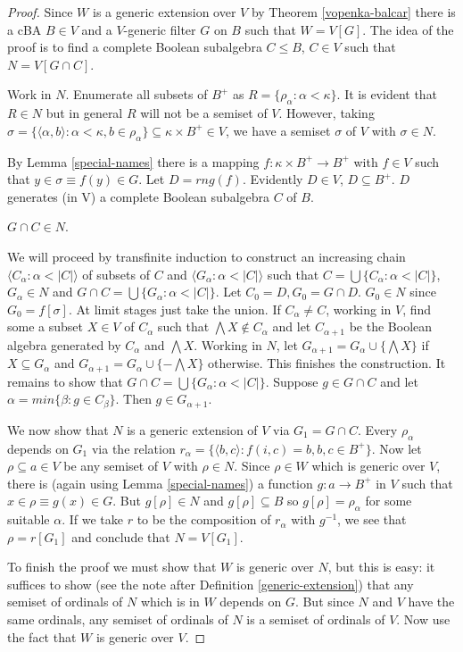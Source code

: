 \begin{proof}
Since $W$ is a generic extension over $V$ by Theorem \ref{vopenka-balcar} there is a cBA $B\in V$ and a $V$-generic filter $G$ on $B$ such that
$W=V[G]$. The idea of the proof is to find a complete Boolean subalgebra $C\leq B$, $C\in V$ such that $N=V[G\cap C]$.

Work in $N$. Enumerate all subsets of $B^+$ as $R=\{\rho_\alpha:\alpha<\kappa\}$. It is evident that $R\in N$ but in general $R$ will not be a semiset of $V$.
However, taking $\sigma=\{\langle\alpha,b\rangle:\alpha<\kappa,b\in\rho_\alpha\}\subseteq\kappa\times B^+\in V$, we have a semiset $\sigma$ of $V$ with $\sigma\in N$.

By Lemma \ref{special-names} there is a mapping $f:\kappa\times B^+\to B^+$ with $f\in V$ such that $y\in\sigma\equiv f(y)\in G$. Let $D=rng(f)$. Evidently
$D\in V$, $D\subseteq B^+$. $D$ generates (in V) a complete Boolean subalgebra $C$ of $B$.

\begin{claim}
 $G\cap C\in N$.
\end{claim}


We will proceed by transfinite induction to construct an increasing chain $\langle C_\alpha:\alpha<|C|\rangle$ of subsets of $C$ and $\langle G_\alpha:\alpha<|C|\rangle$
such that $C=\bigcup\{C_\alpha:\alpha<|C|\}$, $G_\alpha\in N$ and $G\cap C=\bigcup\{G_\alpha:\alpha<|C|\}$. Let $C_0=D, G_0=G\cap D$. $G_0\in N$ since $G_0=f[\sigma]$.
At limit stages just take the union. If $C_\alpha\neq C$, working in $V$, find some a subset $X\in V$ of $C_\alpha$ such that $\bigwedge X\not\in C_\alpha$ and let $C_{\alpha+1}$ be the Boolean algebra generated by $C_\alpha$ and $\bigwedge X$. Working in $N$, let $G_{\alpha+1}=G_\alpha\cup\{\bigwedge X\}$ if $X\subseteq G_\alpha$
and $G_{\alpha+1}=G_\alpha\cup\{-\bigwedge X\}$ otherwise. This finishes the construction. It remains to show that $G\cap C=\bigcup\{G_\alpha:\alpha<|C|\}$. Suppose
$g\in G\cap C$ and let $\alpha = min\{\beta:g\in C_\beta\}$. Then $g\in G_{\alpha+1}$.

\smallskip

We now show that $N$ is a generic extension of $V$ via $G_1=G\cap C$. Every $\rho_\alpha$ depends on $G_1$ via the relation $r_\alpha=\{\langle b,c\rangle:f(i,c)=b, b,c\in B^+\}$.
Now let $\rho\subseteq a\in V$ be any semiset of $V$ with $\rho\in N$. Since $\rho\in W$ which is generic over $V$, there is (again using Lemma \ref{special-names})
a function $g:a\to B^+$ in $V$ such that $x\in\rho\equiv g(x)\in G$. But $g[\rho]\in N$ and $g[\rho]\subseteq B$ so $g[\rho]=\rho_\alpha$ for some suitable $\alpha$.
If we take $r$ to be the composition of $r_\alpha$ with $g^{-1}$, we see that $\rho=r[G_1]$ and conclude that $N=V[G_1]$.

\smallskip

To finish the proof we must show that $W$ is generic over $N$, but this is easy: it suffices to show (see the note after Definition \ref{generic-extension}) that
any semiset of ordinals of $N$ which is in $W$ depends on $G$. But since $N$ and $V$ have the same ordinals, any semiset of ordinals of $N$ is a semiset of ordinals
of $V$. Now use the fact that $W$ is generic over $V$.
\end{proof}

